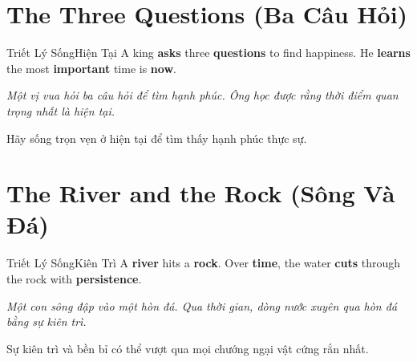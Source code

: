 \section{The Three Questions (Ba Câu Hỏi)}
\begin{truyen}{Triết Lý Sống}{Hiện Tại}
A king \textbf{asks} three \textbf{questions} to find happiness. He \textbf{learns} the most \textbf{important} time is \textbf{now}.

\textit{Một vị vua hỏi ba câu hỏi để tìm hạnh phúc. Ông học được rằng thời điểm quan trọng nhất là hiện tại.}

\begin{baihoc}
Hãy sống trọn vẹn ở hiện tại để tìm thấy hạnh phúc thực sự.
\end{baihoc}
\end{truyen}

\section{The River and the Rock (Sông Và Đá)}
\begin{truyen}{Triết Lý Sống}{Kiên Trì}
A \textbf{river} hits a \textbf{rock}. Over \textbf{time}, the water \textbf{cuts} through the rock with \textbf{persistence}.

\textit{Một con sông đập vào một hòn đá. Qua thời gian, dòng nước xuyên qua hòn đá bằng sự kiên trì.}

\begin{baihoc}
Sự kiên trì và bền bỉ có thể vượt qua mọi chướng ngại vật cứng rắn nhất.
\end{baihoc}
\end{truyen}

